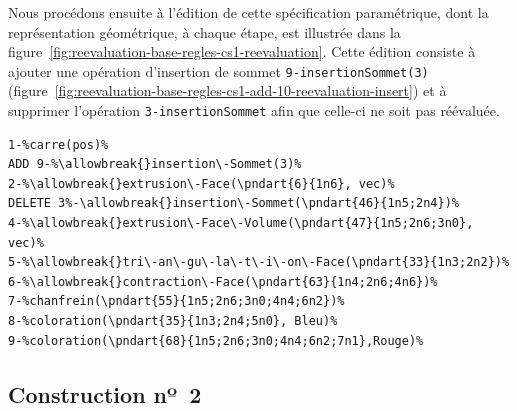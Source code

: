 Nous procédons ensuite à l'édition de cette spécification paramétrique, dont la
représentation géométrique, à chaque étape, est illustrée dans la
figure~\ref{fig:reevaluation-base-regles-cs1-reevaluation}. %
Cette édition consiste à ajouter une opération d'insertion de sommet
\texttt{9-\allowbreak{}insertion\-Sommet(3)}
(figure~\ref{fig:reevaluation-base-regles-cs1-add-10-reevaluation-insert}) et
à supprimer l'opération \texttt{3-\allowbreak{}insertion\-Sommet} afin que celle-ci ne soit pas
réévaluée. %

\begin{lstlisting}[escapechar=\%,
style=script-style,
caption=Spécification paramétrique éditée du cas nº~1,
label=lst:reevaluation-regles-specification-parametrique-edit-cas-1,
captionpos=b]
1-%carre(pos)%
ADD 9-%\allowbreak{}insertion\-Sommet(3)%
2-%\allowbreak{}extrusion\-Face(\pndart{6}{1n6}, vec)%
DELETE 3%-\allowbreak{}insertion\-Sommet(\pndart{46}{1n5;2n4})%
4-%\allowbreak{}extrusion\-Face\-Volume(\pndart{47}{1n5;2n6;3n0}, vec)%
5-%\allowbreak{}tri\-an\-gu\-la\-t\-i\-on\-Face(\pndart{33}{1n3;2n2})%
6-%\allowbreak{}contraction\-Face(\pndart{63}{1n4;2n6;4n6})%
7-%chanfrein(\pndart{55}{1n5;2n6;3n0;4n4;6n2})%
8-%coloration(\pndart{35}{1n3;2n4;5n0}, Bleu)%
9-%coloration(\pndart{68}{1n5;2n6;3n0;4n4;6n2;7n1},Rouge)%
\end{lstlisting}



\subsection{Construction nº~2}
\label{sec:reevaluation-base-regles-deuxieme-cas}



